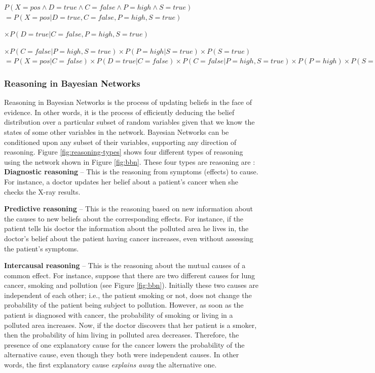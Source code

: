 \documentclass[11pt]{article}
\begin{document}
\begin{footnotesize}
\noindent $P(X= pos \wedge D = true \wedge C = false \wedge P = high \wedge S =
true)$\\

\noindent $= P(X= pos | D = true , C = false , P = high , S = true)$

\noindent $\times P(D = true | C = false , P = high , S = true)$

\noindent $\times P(C = false | P = high , S = true) \times P(P = high| S =
true) \times P(S = true)$\\

\noindent $= P(X= pos | C = false) \times P(D = true | C = false) \times P(C =
false | P = high , S = true) \times P(P = high) \times P(S = true)$
\end{footnotesize}

\subsubsection{Reasoning in Bayesian Networks}

Reasoning in Bayesian Networks is the process of updating beliefs in the face of
evidence. In other words, it is the process of efficiently deducing the belief
distribution over a particular subset of random variables given that we know the
states of some other variables in the network. Bayesian Networks can be
conditioned upon any subset of their variables, supporting any direction of
reasoning. Figure \ref{fig:reasoning-types} shows four different types of
reasoning using the network shown in Figure \ref{fig:bbn}. These four types are
reasoning are \cite{korb:bayesian-ai}:\\

\textbf{Diagnostic reasoning} -- This is the reasoning from symptoms (effects)
to cause. For instance, a doctor updates her belief about a patient's cancer
when she checks the X-ray results.

\textbf{Predictive reasoning} -- This is the reasoning based on new information
about the causes to new beliefs about the corresponding effects. For instance,
if the patient tells his doctor the information about the polluted area he
lives in, the doctor's belief about the patient having cancer increases, even
without assessing the patient's symptoms.

\textbf{Intercausal reasoning} -- This is the reasoning about the mutual causes
of a common effect. For instance,  suppose that there are two different causes
for lung cancer, smoking and pollution (see Figure \ref{fig:bbn}). Initially
these two causes are independent of each other; i.e., the patient smoking or
not, does not change the probability of the patient being subject to pollution.
However, as soon as the patient is diagnosed with cancer, the probability of
smoking or living in a polluted area increases. Now, if the doctor discovers
that her patient is a smoker, then the probability of him living in polluted
area decreases. Therefore, the presence of one explanatory cause for the cancer
lowers the probability of the alternative cause, even though they both were
independent causes. In other words, the first explanatory cause \textit{explains
away} the alternative one.
\end{document}
